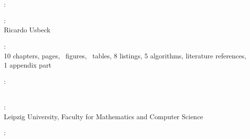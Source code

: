 \thispagestyle{empty}

\hfill

\vfill

~\\
\noindent{}\\



\noindent{}: \\
\myTitle 

\medskip

\noindent{}: \\
Ricardo Usbeck %

\medskip

\noindent{}: \\
10 chapters, \pageref{LastPages} pages, \totfig\ figures, \tottab\ tables, 8 listings, 5 algorithms,  literature references,  1 appendix part

\medskip

\noindent{}: \\
\myProf \\
\mySupervisor

\medskip

\noindent{}: \\
Leipzig University, Faculty for Mathematics and Computer Science

\medskip

\noindent{}: \\
\myTime
